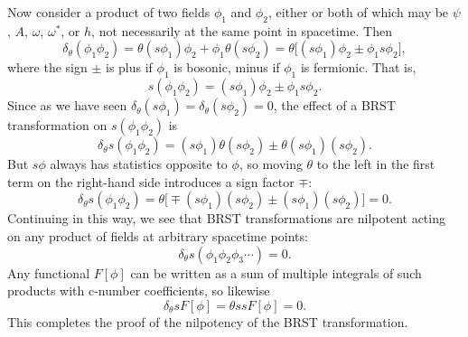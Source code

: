 Now consider a product of two fields $\phi_1$ and $\phi_2$, either or both of which may be $\psi$, $A$, $\omega$, $\omega^*$, or $h$, not necessarily at the same point in spacetime. Then
\[
 \delta_\theta(\phi_1\phi_2)=\theta(s\phi_1)\phi_2+\phi_1\theta(s\phi_2)
 =\theta\bigl[(s\phi_1)\phi_2\mathbin{\pm}\phi_1s\phi_2\bigr],
\]
where the sign $\pm$ is plus if $\phi_1$ is bosonic, minus if $\phi_1$ is fermionic. That is,
\[
 s(\phi_1\phi_2)=(s\phi_1)\phi_2\mathbin{\pm}\phi_1s\phi_2.
\]
Since as we have seen $\delta_\theta(s\phi_1)=\delta_\theta(s\phi_2)=0$, the effect of a BRST transformation on $s(\phi_1\phi_2)$ is
\[
 \delta_\theta s(\phi_1\phi_2)=(s\phi_1)\theta(s\phi_2)\mathbin{\pm}\theta(s\phi_1)(s\phi_2).
\]
But $s\phi$ always has statistics opposite to $\phi$, so moving $\theta$ to the left in the first term on the right-hand side introduces a sign factor $\mp$:
\[
 \delta_\theta s(\phi_1\phi_2)=\theta\bigl[\mp(s\phi_1)(s\phi_2)\mathbin{\pm}(s\phi_1)(s\phi_2)\bigr]=0.
\]
Continuing in this way, we see that BRST transformations are nilpotent acting on any product of fields at arbitrary spacetime points:
\[
 \delta_\theta s(\phi_1\phi_2\phi_3\cdots)=0.
\]
Any functional $F[\phi]$ can be written as a sum of multiple integrals of such products with c-number coefficients, so likewise
\begin{equation}
 \delta_\theta sF[\phi]=\theta ssF[\phi]=0.
 \tag{15.7.20}\label{eq:15.7.20}
\end{equation}
This completes the proof of the nilpotency of the BRST transformation.

